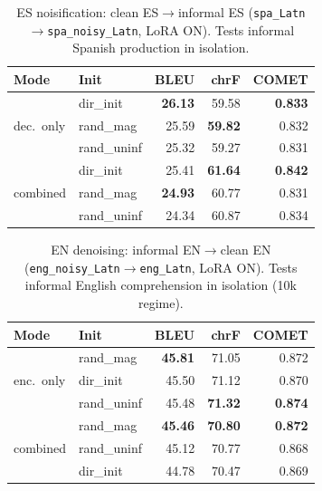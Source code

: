 \documentclass[11pt]{article}
\begin{document}
\begin{table}[t]
  \centering
  \small
  \begin{tabular}{llrrr}
    \toprule
    \textbf{Mode} & \textbf{Init} & \textbf{BLEU} & \textbf{chrF} & \textbf{COMET} \\
    \midrule
    \multirow{3}{*}{dec.\ only}
      & dir\_init   & \textbf{26.13} & 59.58 & \textbf{0.833} \\
      & rand\_mag   & 25.59 & \textbf{59.82} & 0.832 \\
      & rand\_uninf & 25.32 & 59.27 & 0.831 \\
    \midrule
    \multirow{3}{*}{combined}
      & dir\_init   & 25.41 & \textbf{61.64} & \textbf{0.842} \\
      & rand\_mag   & \textbf{24.93} & 60.77 & 0.831 \\
      & rand\_uninf & 24.34 & 60.87 & 0.834 \\
    \bottomrule
  \end{tabular}
  \caption{ES noisification: clean ES$\rightarrow$informal ES
    (\texttt{spa\_Latn}$\rightarrow$\texttt{spa\_noisy\_Latn}, LoRA ON).
    Tests informal Spanish production in isolation.}
  \label{tab:noisify_results}
\end{table}


\begin{table}[t]
  \centering
  \small
  \begin{tabular}{llrrr}
    \toprule
    \textbf{Mode} & \textbf{Init} & \textbf{BLEU} & \textbf{chrF} & \textbf{COMET} \\
    \midrule
    \multirow{3}{*}{enc.\ only}
      & rand\_mag   & \textbf{45.81} & 71.05 & 0.872 \\
      & dir\_init   & 45.50 & 71.12 & 0.870 \\
      & rand\_uninf & 45.48 & \textbf{71.32} & \textbf{0.874} \\
    \midrule
    \multirow{3}{*}{combined}
      & rand\_mag   & \textbf{45.46} & \textbf{70.80} & \textbf{0.872} \\
      & rand\_uninf & 45.12 & 70.77 & 0.868 \\
      & dir\_init   & 44.78 & 70.47 & 0.869 \\
    \bottomrule
  \end{tabular}
  \caption{EN denoising: informal EN$\rightarrow$clean EN
    (\texttt{eng\_noisy\_Latn}$\rightarrow$\texttt{eng\_Latn}, LoRA ON).
    Tests informal English comprehension in isolation (10k regime).}
  \label{tab:denoise_results}
\end{table}
\end{document}

